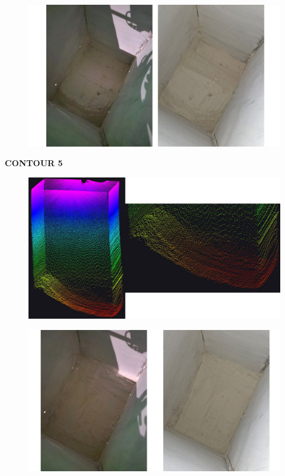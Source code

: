 \vspace{0.5cm}

\begin{figure}[H]
	\centering
	\includegraphics[width=1\textwidth]{Figures/test3-4-actual}
\end{figure}

\newpage

\textbf{CONTOUR 5}

\begin{figure}[H]
	\centering
	\includegraphics[width=1\textwidth]{Figures/test3-5}
\end{figure}

\vspace{0.5cm}

\begin{figure}[H]
	\centering
	\includegraphics[width=1\textwidth]{Figures/test3-5-actual}
\end{figure}

